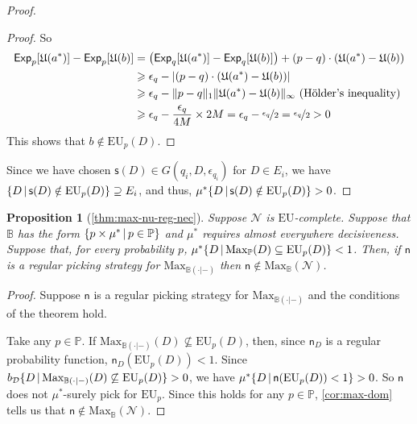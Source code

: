 \documentclass[a4paper,final]{article}
\newtheorem{proposition}[theorem]{Proposition}
\renewcommand\P{\mathbb{P}} %
\newcommand\Exp{\mathsf{Exp}}
\newcommand\EU{\mathrm{EU}}
\newcommand\U{\mathfrak{U}} %
\newcommand\Maximality{\mathrm{Max}}
\newcommand{\D}{\mathcal{D}}
\newcommand\s{\mathsf{s}}
\newcommand{\n}{\mathsf{n}}
\renewcommand{\nu}{\n}
\newcommand\Nu{\mathcal{N}}
\newcommand{\IB}{\mathbb{B}}
\newcommand{\IP}{\P}
\renewcommand{\color}[1]{}
\newenvironment{colored}[1]{\leavevmode\color{#1}}{}
\newcommand\SetDelimiter[1][]{
	\nonscript\,#1\vert \allowbreak \nonscript\,\mathopen{}}
\providecommand\given{\SetDelimiter}
\renewcommand{\geq}{\geqslant}
\newenvironment{CCM rewritten}
{\begingroup\color{blue}} %
{\endgroup}              %
\begin{document}
\begin{colored}{blue}
\begin{proof}
\begin{proof}
		So	
		\begin{align}
			\Exp_p[\U(a^*)]-\Exp_p[\U(b)]&=\left(\Exp_q[\U(a^*)]-\Exp_q[\U(b)]\right)+(p-q)\cdot(\U(a^*)-\U(b))\\
			&\geq \epsilon_q -|(p-q)\cdot(\U(a^*)-\U(b))|\\
			&\geq \epsilon_q -\|p-q\|_1\|\U(a^*)-\U(b)\|_\infty \ \text{(H\"older's inequality)}\\
			&\geq  \epsilon_q -\frac{\epsilon_q}{4M}\times 2M=\epsilon_q -\nicefrac{\epsilon_q}{2}=\nicefrac{\epsilon_q}{2}>0
		\end{align}
		This shows that $b\notin\EU_p(D)$. 
	\end{proof}
	Since we have chosen $\s(D)\in G(q_i,D,\epsilon_{q_i})$ for $D\in E_i$, we have $\{D\given \s(D)\notin\EU_p(D)\}\supseteq E_i$, and thus, $\mu^*\{D\given \s(D)\notin\EU_p(D)\}>0$. 
\end{proof}




\end{colored}










\begin{proposition}[\cref{thm:max-nu-reg-nec}]
	Suppose $\Nu$ is $\EU$-complete. 
	Suppose that $\IB$ has the form $\{p\times \mu^*\given p\in \IP\}$ and $\mu^*$ requires almost everywhere decisiveness. Suppose that, for every probability $p$, $\mu^*\{D\given \Maximality_\IP(D)\subseteq\EU_p(D)\}< 1$. Then, if $\n$ is a regular picking strategy for $\Maximality_{\IB(\cdot|-)}$ then $\n\notin \Maximality_\IB(\Nu)$.
\end{proposition}

\begin{proof}
	Suppose $\nu$ is a regular picking strategy for $\Maximality_{\IB(\cdot|-)}$ and the conditions of the theorem hold. 
	
	Take any $p\in\IP$.
	If $\Maximality_{\IB(\cdot|-)}(D)\not\subseteq\EU_p(D)$, then, since $\n_D$ is a regular probability function, $\nu_D(\EU_p(D))< 1$. 
	Since 
	$b_\D\{D\given \Maximality_{\IB(\cdot|-)}(D)\not\subseteq\EU_p(D)\}>0$, we have $\mu^*\{D\given \nu(\EU_p(D))<1\}>0$.
	 So $\nu$ does not $\mu^*$-surely pick for $\EU_p$. Since this holds for any $p \in \IP$, \cref{cor:max-dom} tells us that $\nu\notin\Maximality_\IB(\Nu)$. 
\end{proof}
\end{document}

